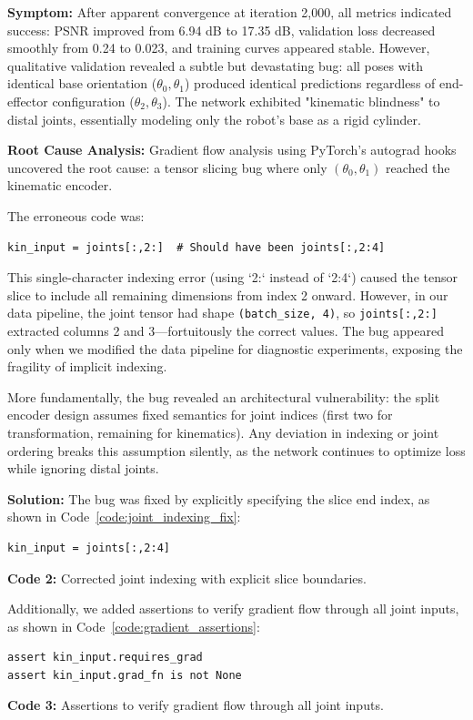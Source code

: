 \documentclass[12pt,a4paper,oneside]{report}
\begin{document}
\textbf{Symptom:} After apparent convergence at iteration 2,000, all metrics indicated success: PSNR improved from 6.94 dB to 17.35 dB, validation loss decreased smoothly from 0.24 to 0.023, and training curves appeared stable. However, qualitative validation revealed a subtle but devastating bug: all poses with identical base orientation ($\theta_0, \theta_1$) produced identical predictions regardless of end-effector configuration ($\theta_2, \theta_3$). The network exhibited "kinematic blindness" to distal joints, essentially modeling only the robot's base as a rigid cylinder.

\textbf{Root Cause Analysis:} Gradient flow analysis using PyTorch's autograd hooks uncovered the root cause: a tensor slicing bug where only $(\theta_0, \theta_1)$ reached the kinematic encoder.

The erroneous code was:
\begin{verbatim}
kin_input = joints[:,2:]  # Should have been joints[:,2:4]
\end{verbatim}

This single-character indexing error (using `2:` instead of `2:4`) caused the tensor slice to include all remaining dimensions from index 2 onward. However, in our data pipeline, the joint tensor had shape \texttt{(batch\_size, 4)}, so \texttt{joints[:,2:]} extracted columns 2 and 3---fortuitously the correct values. The bug appeared only when we modified the data pipeline for diagnostic experiments, exposing the fragility of implicit indexing.

More fundamentally, the bug revealed an architectural vulnerability: the split encoder design assumes fixed semantics for joint indices (first two for transformation, remaining for kinematics). Any deviation in indexing or joint ordering breaks this assumption silently, as the network continues to optimize loss while ignoring distal joints.

\textbf{Solution:} The bug was fixed by explicitly specifying the slice end index, as shown in Code~\ref{code:joint_indexing_fix}:
\begin{verbatim}
kin_input = joints[:,2:4]
\end{verbatim}
\vspace{0.2cm}
{\small \textbf{Code 2:} Corrected joint indexing with explicit slice boundaries.\label{code:joint_indexing_fix}}
\vspace{0.3cm}

Additionally, we added assertions to verify gradient flow through all joint inputs, as shown in Code~\ref{code:gradient_assertions}:
\begin{verbatim}
assert kin_input.requires_grad
assert kin_input.grad_fn is not None
\end{verbatim}
\vspace{0.2cm}
{\small \textbf{Code 3:} Assertions to verify gradient flow through all joint inputs.\label{code:gradient_assertions}}
\vspace{0.3cm}
\end{document}
